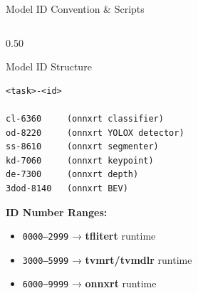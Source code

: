\documentclass[aspectratio=169,12pt]{beamer}
\newcommand{\blue}[1]{\textcolor{TIBlue}{\textbf{#1}}}
\begin{document}
\begin{frame}{Model ID Convention \& Scripts}
  \begin{columns}[T]
    \begin{column}{0.50\textwidth}
      \begin{block}{Model ID Structure}
        \begin{lstlisting}
<task>-<id>

cl-6360     (onnxrt classifier)
od-8220     (onnxrt YOLOX detector)
ss-8610     (onnxrt segmenter)
kd-7060     (onnxrt keypoint)
de-7300     (onnxrt depth)
3dod-8140   (onnxrt BEV)
        \end{lstlisting}
      \end{block}

      \vspace{0.3cm}
      \textbf{ID Number Ranges:}
      \begin{itemize}\scriptsize
        \item \texttt{0000–2999} → \blue{tflitert} runtime
        \item \texttt{3000–5999} → \blue{tvmrt/tvmdlr} runtime
        \item \texttt{6000–9999} → \blue{onnxrt} runtime
      \end{itemize}
    \end{column}


\end{columns}
\end{frame}
\end{document}
